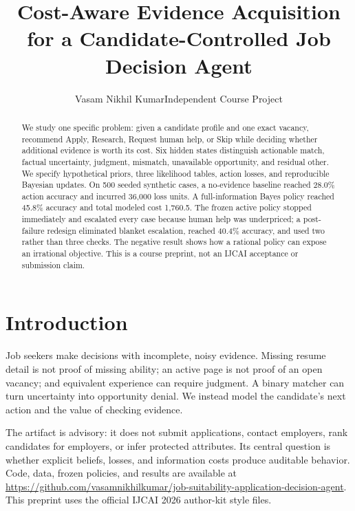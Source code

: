 \documentclass{article}
\title{Cost-Aware Evidence Acquisition for a Candidate-Controlled Job Decision Agent}
\author{Vasam Nikhil Kumar\affiliations Independent Course Project}
\begin{document}
\maketitle

\begin{abstract}
We study one specific problem: given a candidate profile and one exact vacancy, recommend Apply, Research, Request human help, or Skip while deciding whether additional evidence is worth its cost. Six hidden states distinguish actionable match, factual uncertainty, judgment, mismatch, unavailable opportunity, and residual other. We specify hypothetical priors, three likelihood tables, action losses, and reproducible Bayesian updates. On 500 seeded synthetic cases, a no-evidence baseline reached 28.0\% action accuracy and incurred 36,000 loss units. A full-information Bayes policy reached 45.8\% accuracy and total modeled cost 1,760.5. The frozen active policy stopped immediately and escalated every case because human help was underpriced; a post-failure redesign eliminated blanket escalation, reached 40.4\% accuracy, and used two rather than three checks. The negative result shows how a rational policy can expose an irrational objective. This is a course preprint, not an IJCAI acceptance or submission claim.
\end{abstract}

\section{Introduction}
Job seekers make decisions with incomplete, noisy evidence. Missing resume detail is not proof of missing ability; an active page is not proof of an open vacancy; and equivalent experience can require judgment. A binary matcher can turn uncertainty into opportunity denial. We instead model the candidate's next action and the value of checking evidence.

The artifact is advisory: it does not submit applications, contact employers, rank candidates for employers, or infer protected attributes. Its central question is whether explicit beliefs, losses, and information costs produce auditable behavior. Code, data, frozen policies, and results are available at \url{https://github.com/vasamnikhilkumar/job-suitability-application-decision-agent}. This preprint uses the official IJCAI 2026 author-kit style files.
\end{document}
